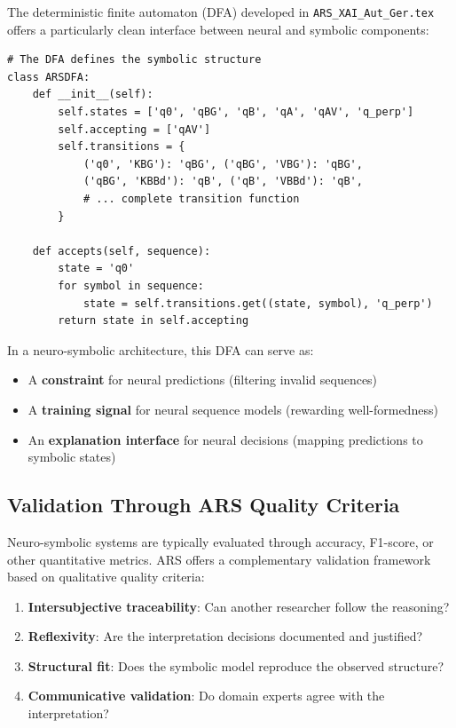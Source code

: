 \documentclass[12pt,a4paper]{article}
\begin{document}
The deterministic finite automaton (DFA) developed in \texttt{ARS\_XAI\_Aut\_Ger.tex} 
offers a particularly clean interface between neural and symbolic components:

\begin{lstlisting}[caption=DFA as Neuro-Symbolic Interface]
# The DFA defines the symbolic structure
class ARSDFA:
    def __init__(self):
        self.states = ['q0', 'qBG', 'qB', 'qA', 'qAV', 'q_perp']
        self.accepting = ['qAV']
        self.transitions = {
            ('q0', 'KBG'): 'qBG', ('qBG', 'VBG'): 'qBG',
            ('qBG', 'KBBd'): 'qB', ('qB', 'VBBd'): 'qB',
            # ... complete transition function
        }
    
    def accepts(self, sequence):
        state = 'q0'
        for symbol in sequence:
            state = self.transitions.get((state, symbol), 'q_perp')
        return state in self.accepting
\end{lstlisting}

In a neuro-symbolic architecture, this DFA can serve as:

\begin{itemize}
    \item A \textbf{constraint} for neural predictions (filtering invalid sequences)
    \item A \textbf{training signal} for neural sequence models (rewarding well-formedness)
    \item An \textbf{explanation interface} for neural decisions (mapping predictions to symbolic states)
\end{itemize}

\subsection{Validation Through ARS Quality Criteria}

Neuro-symbolic systems are typically evaluated through accuracy, F1-score, or 
other quantitative metrics. ARS offers a complementary validation framework 
based on qualitative quality criteria:

\begin{enumerate}
    \item \textbf{Intersubjective traceability}: Can another researcher follow 
    the reasoning?
    \item \textbf{Reflexivity}: Are the interpretation decisions documented and 
    justified?
    \item \textbf{Structural fit}: Does the symbolic model reproduce the 
    observed structure?
    \item \textbf{Communicative validation}: Do domain experts agree with the 
    interpretation?
\end{enumerate}
\end{document}
